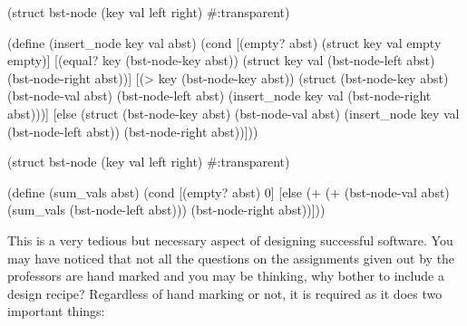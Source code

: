 \clearpage
{}

\begin{code}[Lisp]
(struct bst-node (key val left right) #:transparent)

(define (insert_node key val abst)
	(cond
		[(empty? abst) (struct key val empty empty)]
		[(equal? key (bst-node-key abst)) (struct key val 
		                                          (bst-node-left abst)
		                                          (bst-node-right abst))]
		[(> key (bst-node-key abst)) (struct (bst-node-key abst)
		                                     (bst-node-val abst)
		                                     (bst-node-left abst)
		                                     (insert_node key val 
		                                                  (bst-node-right abst)))]
		[else (struct (bst-node-key abst)
		              (bst-node-val abst)
		              (insert_node key val (bst-node-left abst))
		              (bst-node-right abst))]))
\end{code}


\begin{code}[Lisp]
(struct bst-node (key val left right) #:transparent)

(define (sum_vals abst)
	(cond
		[(empty? abst) 0]
		[else (+ (+ (bst-node-val abst) (sum_vals (bst-node-left abst))) 
		         (bst-node-right abst))]))
\end{code}



This is a very tedious but necessary aspect of designing successful software. You may have noticed that not all the questions on the assignments given out by the professors are hand marked and you may be thinking, why bother to include a design recipe? Regardless of hand marking or not, it is required as it does two important things:

